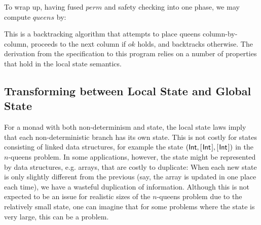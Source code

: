 \documentclass{llncs}
\newcommand{\Conid}[1]{\mathit{#1}}
\newcommand{\Varid}[1]{\mathit{#1}}
\def\resethooks{%
  \global\let\SaveRestoreHook\empty
  \global\let\ColumnHook\empty}
\let\hspre\empty
\let\hspost\empty
\let\Varid\mathit
\let\Conid\mathsf
\begin{document}
To wrap up, having fused \ensuremath{\Varid{perm}} and safety checking into one phase, we may compute \ensuremath{\Varid{queens}} by:
\resethooks
This is a backtracking algorithm that attempts to place queens column-by-column, proceeds to the next column if \ensuremath{\Varid{ok}} holds, and backtracks otherwise.
The derivation from the specification to this program relies on a number of properties that hold in the local state semantics.

\subsection{Transforming between Local State and Global State}
\label{sec:space-usage}
For a monad with both non-determinism and state, the local state laws imply that
each non-deterministic branch has its own state. This is not costly for states
consisting of linked data structures, for example the state
\ensuremath{(\Conid{Int},[\mskip1.5mu \Conid{Int}\mskip1.5mu],[\mskip1.5mu \Conid{Int}\mskip1.5mu])}
in the \ensuremath{\Varid{n}}-queens problem. In some applications, however, the state
might be represented by data structures, e.g. arrays, that are costly to
duplicate: 
When each new state is only slightly different from the previous
(say, the array is updated in one place each time), we have a wasteful
duplication of information.
Although this is not expected to be an issue for realistic sizes of the
\ensuremath{\Varid{n}}-queens problem due to the relatively small state, one can imagine that for
some problems where the state is very large, this can be a problem.
\end{document}
